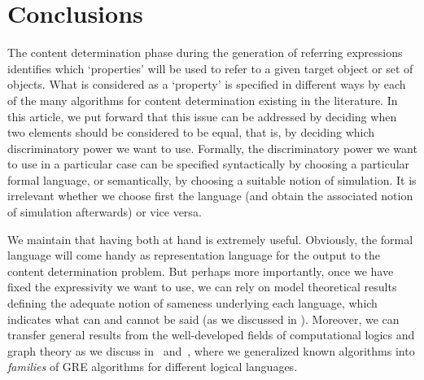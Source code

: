 \section{Conclusions}\label{sec:conclusions}


The content determination phase during the generation of referring
expressions identifies which `properties' will be used to refer to a
given target object or set of objects. What is considered as a
`property' is specified in different ways by each of the many
algorithms for content determination existing  in the literature. In
this article, we put forward that this issue can be addressed by
deciding when two elements should be considered to be equal, that
is, by deciding which discriminatory power we want to use. Formally,
the discriminatory power we want to use in a particular case can be
specified syntactically by choosing a particular formal language, or
semantically, by choosing a suitable notion of simulation.  It is
irrelevant whether we choose first the language (and obtain the
associated notion of simulation afterwards) or vice versa.

We maintain that having both at hand is extremely useful. Obviously,
the formal language will come handy as representation language for
the output to the content determination problem.  But perhaps more
importantly, once we have fixed the expressivity we want to use, we
can  rely on model theoretical results defining the adequate notion
of sameness underlying each language, which indicates what can and
cannot be said (as we discussed in ). Moreover, we
can transfer general results from the well-developed fields of
computational logics and graph theory as we discuss
in~ and~, where we generalized known
algorithms into \emph{families} of GRE algorithms for different
logical languages. %






